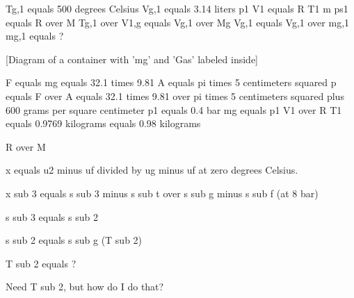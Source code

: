 Tg,1 equals 500 degrees Celsius  
Vg,1 equals 3.14 liters  
p1 V1 equals R T1 m  
ps1 equals R over M Tg,1 over V1,g equals Vg,1 over Mg  
Vg,1 equals Vg,1 over mg,1  
mg,1 equals ?  

[Diagram of a container with 'mg' and 'Gas' labeled inside]  

F equals mg equals 32.1 times 9.81  
A equals pi times 5 centimeters squared  
p equals F over A equals 32.1 times 9.81 over pi times 5 centimeters squared plus 600 grams per square centimeter p1 equals 0.4 bar  
mg equals p1 V1 over R T1 equals 0.9769 kilograms equals 0.98 kilograms  

R over M

x equals u2 minus uf divided by ug minus uf at zero degrees Celsius.

x sub 3 equals s sub 3 minus s sub t over s sub g minus s sub f (at 8 bar)

s sub 3 equals s sub 2

s sub 2 equals s sub g (T sub 2)

T sub 2 equals ?

Need T sub 2, but how do I do that?